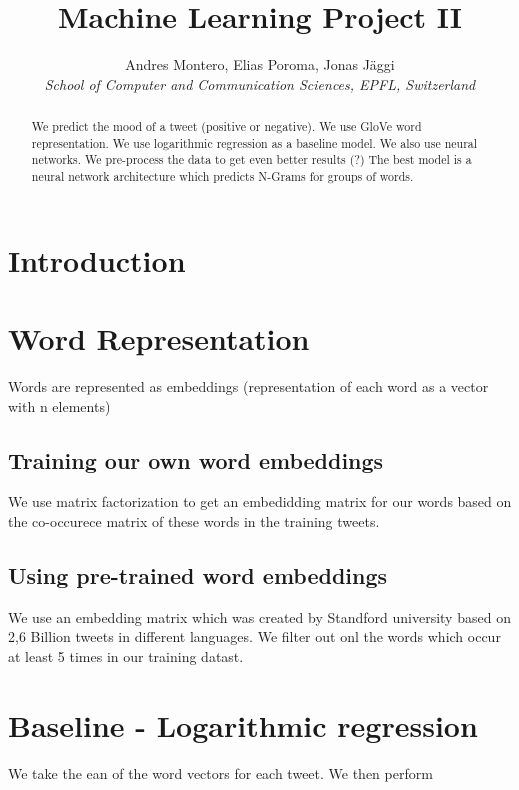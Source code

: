 \documentclass[10pt,conference,compsocconf]{IEEEtran}
\begin{document}
\title{Machine Learning Project II}

\author{
  Andres Montero, Elias Poroma, Jonas J\"aggi\\
  \textit{School of Computer and Communication Sciences, EPFL, Switzerland}
}

\maketitle

\begin{abstract}
We predict the mood of a tweet (positive or negative). 
We use GloVe word representation.
We use logarithmic regression as a baseline model.
We also use neural networks.
We pre-process the data to get even better results (?)
The best model is a neural network architecture which predicts N-Grams for groups of words.

\end{abstract}

\section{Introduction}



\section{Word Representation}

Words are represented as embeddings (representation of each word as a vector with n elements)

\subsection{Training our own word embeddings}
We use matrix factorization to get an embedidding matrix for our words based on the     co-occurece matrix of these words in the training tweets.
 
 \subsection{Using pre-trained word embeddings}
 We use an embedding matrix which was created by Standford university based on 2,6 Billion tweets in different languages. We filter out onl the words which occur at least 5 times in  our training datast.

\section{Baseline - Logarithmic regression}
We take the ean of the word vectors for each tweet. We then perform 
\end{document}
